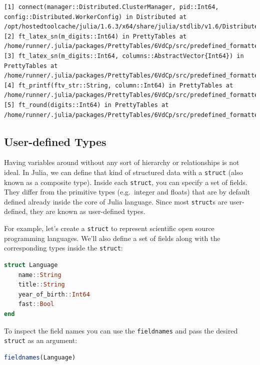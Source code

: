 \documentclass[
  notoc %
]{tufte-book}
\newcommand{\passthrough}[1]{#1}
\begin{document}
\begin{lstlisting}[language=Output]
[1] connect(manager::Distributed.ClusterManager, pid::Int64, config::Distributed.WorkerConfig) in Distributed at /opt/hostedtoolcache/julia/1.6.3/x64/share/julia/stdlib/v1.6/Distributed/src/managers.jl:516
[2] ft_latex_sn(m_digits::Int64) in PrettyTables at /home/runner/.julia/packages/PrettyTables/6VdCp/src/predefined_formatters.jl:137
[3] ft_latex_sn(m_digits::Int64, columns::AbstractVector{Int64}) in PrettyTables at /home/runner/.julia/packages/PrettyTables/6VdCp/src/predefined_formatters.jl:139
[4] ft_printf(ftv_str::String, column::Int64) in PrettyTables at /home/runner/.julia/packages/PrettyTables/6VdCp/src/predefined_formatters.jl:28
[5] ft_round(digits::Int64) in PrettyTables at /home/runner/.julia/packages/PrettyTables/6VdCp/src/predefined_formatters.jl:78
\end{lstlisting}

\hypertarget{sec:struct}{%
\subsection{User-defined Types}\label{sec:struct}}

Having variables around without any sort of hierarchy or relationships
is not ideal. In Julia, we can define that kind of structured data with
a \passthrough{\lstinline!struct!} (also known as a composite type).
Inside each \passthrough{\lstinline!struct!}, you can specify a set of
fields. They differ from the primitive types (e.g.~integer and floats)
that are by default defined already inside the core of Julia language.
Since most \passthrough{\lstinline!struct!}s are user-defined, they are
known as user-defined types.

For example, let's create a \passthrough{\lstinline!struct!} to
represent scientific open source programming languages. We'll also
define a set of fields along with the corresponding types inside the
\passthrough{\lstinline!struct!}:

\begin{lstlisting}[language=Julia]
struct Language
    name::String
    title::String
    year_of_birth::Int64
    fast::Bool
end
\end{lstlisting}

To inspect the field names you can use the
\passthrough{\lstinline!fieldnames!} and pass the desired
\passthrough{\lstinline!struct!} as an argument:

\begin{lstlisting}[language=Julia]
fieldnames(Language)
\end{lstlisting}
\end{document}
